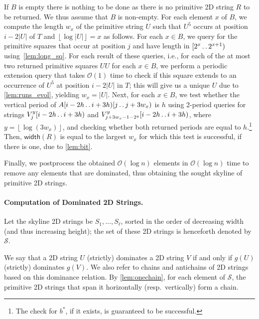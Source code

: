 \documentclass[11pt,letterpaper]{article}
\newcommand{\cO}{\mathcal{O}}
\newcommand{\floor}[1]{\left\lfloor #1 \right\rfloor}
\newcommand{\width}{\textsf{width}}
\def\dd{\mathinner{.\,.}}
\renewcommand{\S}{\mathcal{S}}
\newcommand{\R}{\mathcal{R}_{\S}}
\newcommand{\vmeta}[2]{V_{#1}^{#2}}
\begin{document}
If $B$ is empty there is nothing to be done as there is no primitive 2D string $R$ to be returned.
We thus assume that $B$ is non-empty.
For each element $x$ of $B$, we compute the length $w_x$ of the primitive string $U$ such that $U^5$ occurs at position $i-2|U|$ of $T$ and $\floor{\log |U|}=x$ as follows.
For each $x \in B$, we query for the primitive squares that occur at position $j$ and have length in $[2^x \dd 2^{x+1})$ using~\ref{lem:long_sq}.
For each result of these queries, i.e., for each of the at most two returned primitive squares $UU$ for each $x \in B$, we perform a periodic extension query that takes $\cO(1)$ time to check if this square extends to an occurrence of $U^5$ at position $i-2|U|$ in $T$; this will give us a unique $U$ due to \cref{lem:runs_evol}, yielding $w_x=|U|$.
Next, for each $x \in B$, we test whether the vertical period of $A[i-2h \dd i+3h)[j \dd j+3w_x)$ is $h$ using 2-period queries for strings $\vmeta{j}{y}[i-2h \dd i+3h)$ and $\vmeta{j+3w_x-1-2^{y}}{y}[i-2h \dd i+3h)$, where $y=\floor{\log (3w_x)}$, and checking whether both returned periods are equal to $h$.\footnote{The check for $b^*$, if it exists, is guaranteed to be successful.}
Then, $\width(R)$ is equal to the largest $w_x$ for which this test is successful, if there is one, due to \cref{lem:bit}.

Finally, we postprocess the obtained $\cO(\log n)$ elements in $\cO(\log n)$ time to remove any elements that are dominated, thus obtaining the sought skyline of primitive 2D strings.

\paragraph{Computation of Dominated 2D Strings.}

\renewcommand{\R}{\mathcal{R}}

Let the skyline 2D strings be $S_1, \ldots, S_\ell$, sorted in the order of decreasing width (and thus increasing height); the set of these 2D strings is henceforth denoted by $\S$.

We say that a 2D string $U$ (strictly) dominates a 2D string $V$ if and only if $g(U)$ (strictly) dominates $g(V)$.
We also refer to chains and antichains of 2D strings based on this dominance relation.
By \cref{lem:onechain}, for each element of $\S$, the primitive 2D strings that span it horizontally (resp.~vertically) form a chain.
\end{document}
